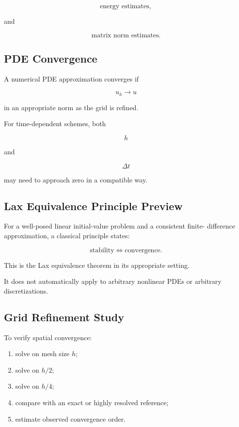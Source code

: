 \[
\boxed{
\text{energy estimates},
}
\]

and

\[
\boxed{
\text{matrix norm estimates}.
}
\]

\subsection{PDE Convergence}
\label{subsec:pde-convergence}

A numerical PDE approximation converges if

\[
\boxed{
u_h
\to
u
}
\]

in an appropriate norm as the grid is refined.

For time-dependent schemes, both

\[
h
\]

and

\[
\Delta t
\]

may need to approach zero in a compatible way.

\subsection{Lax Equivalence Principle Preview}
\label{subsec:lax-equivalence}

For a well-posed linear initial-value problem and a consistent finite-
difference approximation, a classical principle states:

\[
\boxed{
\text{stability}
\Longleftrightarrow
\text{convergence}.
}
\]

This is the Lax equivalence theorem in its appropriate setting.

It does not automatically apply to arbitrary nonlinear PDEs or arbitrary
discretizations.

\subsection{Grid Refinement Study}
\label{subsec:pde-grid-refinement}

To verify spatial convergence:

\begin{enumerate}
    \item solve on mesh size \(h\);
    \item solve on \(h/2\);
    \item solve on \(h/4\);
    \item compare with an exact or highly resolved reference;
    \item estimate observed convergence order.
\end{enumerate}

